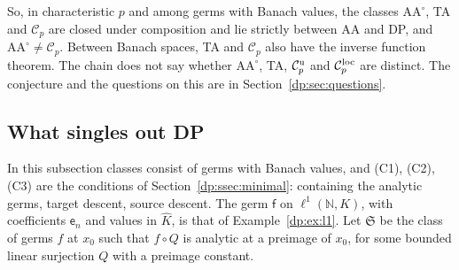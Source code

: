 \documentclass[11pt]{amsart}
\theoremstyle{definition}
\theoremstyle{remark}
\numberwithin{equation}{section}
\newcommand{\N}{\mathbb N}
\newcommand{\cC}{\mathcal{C}}
\newcommand{\Kh}{\widehat K}
\theoremstyle{plain}
\theoremstyle{definition}
\theoremstyle{plain}
\begin{document}
So, in characteristic $p$ and among germs with Banach values, the classes $\mathrm{AA}^\circ$, TA and $\cC_p$ are closed under composition and lie strictly between AA and DP, and $\mathrm{AA}^\circ\ne\cC_p$. Between Banach spaces, TA and $\cC_p$ also have the inverse function theorem. The chain does not say whether $\mathrm{AA}^\circ$, TA, $\cC_p^{\rm u}$ and $\cC_p^{\rm loc}$ are distinct. The conjecture and the questions on this are in Section~\ref{dp:sec:questions}.

\subsection{What singles out DP}\label{dp:ssec:singles}

In this subsection classes consist of germs with Banach values, and (C1), (C2), (C3) are the conditions of Section~\ref{dp:ssec:minimal}: containing the analytic germs, target descent, source descent. The germ $\mathsf f$ on $\ell^1(\N,K)$, with coefficients $\mathsf e_n$ and values in $\Kh$, is that of Example~\ref{dp:ex:l1}. Let $\mathfrak S$ be the class of germs $f$ at $x_0$ such that $f\circ Q$ is analytic at a preimage of $x_0$, for some bounded linear surjection $Q$ with a preimage constant.
\end{document}
